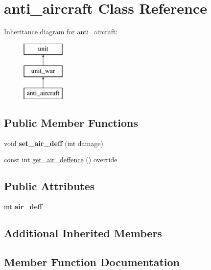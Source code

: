 \hypertarget{classanti__aircraft}{}\section{anti\+\_\+aircraft Class Reference}
\label{classanti__aircraft}
Inheritance diagram for anti\+\_\+aircraft\+:\begin{figure}[H]
\begin{center}
\leavevmode
\includegraphics[height=3.000000cm]{classanti__aircraft}
\end{center}
\end{figure}
\subsection*{Public Member Functions}
\begin{DoxyCompactItemize}
\item 
\mbox{\label{classanti__aircraft_a6085af8f5b8af4370664a9b6f6196c07}} 
void {\bfseries set\+\_\+air\+\_\+deff} (int damage)
\item 
const int \mbox{\hyperlink{classanti__aircraft_aae33f6c35fe31aaefcf0e0cb73838de1}{get\+\_\+air\+\_\+deffence}} () override
\end{DoxyCompactItemize}
\subsection*{Public Attributes}
\begin{DoxyCompactItemize}
\item 
\mbox{\label{classanti__aircraft_ae5ea5a9b7db035d6bd628f3bf3a9a0d9}} 
int {\bfseries air\+\_\+deff}
\end{DoxyCompactItemize}
\subsection*{Additional Inherited Members}


\subsection{Member Function Documentation}
\mbox{\label{classanti__aircraft_aae33f6c35fe31aaefcf0e0cb73838de1}} 

